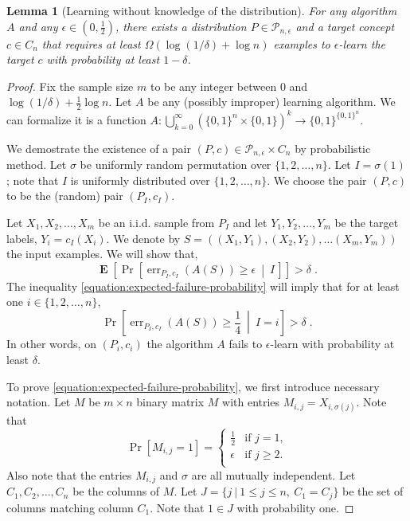 \documentclass[12pt]{article}
\newtheorem{lemma}[proposition]{Lemma}
\renewcommand{\P}{\mathcal{P}}
\DeclareMathOperator{\err}{err}
\DeclareMathOperator{\Exp}{\mathbf{E}}
\begin{document}
\begin{lemma}[Learning without knowledge of the distribution]
For any algorithm $A$ and any $\epsilon \in (0,\frac{1}{2})$,
there exists a distribution $P \in \P_{n,\epsilon}$
and a target concept $c \in C_n$ that requires at least $\Omega(\log(1/\delta) + \log n)$
examples to $\epsilon$-learn the target $c$ with probability at least $1 - \delta$.
\end{lemma}

\begin{proof}
Fix the sample size $m$ to be any integer between $0$ and $\log(1/\delta) + \frac{1}{2} \log n$.
Let $A$ be any (possibly improper) learning algorithm. We can formalize
it is a function $A:\bigcup_{k=0}^\infty (\{0,1\}^n \times \{0,1\})^k \to
\{0,1\}^{\{0,1\}^n}$.

We demostrate the existence of a pair $(P,c) \in \P_{n,\epsilon} \times C_n$ by
probabilistic method. Let $\sigma$ be uniformly random permutation over
$\{1,2,\dots,n\}$. Let $I = \sigma(1)$; note that $I$ is uniformly distributed
over $\{1,2,\dots,n\}$. We choose the pair $(P,c)$ to be the (random) pair
$(P_I,c_I)$.

Let $X_1, X_2, \dots, X_m$ be an i.i.d. sample from $P_I$ and
let $Y_1, Y_2, \dots, Y_m$ be the target labels, $Y_i = c_I(X_i)$.
We denote by $S = ((X_1, Y_1), (X_2, Y_2), \dots (X_m, Y_m))$ the input examples.
We will show that,
\begin{equation}
\label{equation:expected-failure-probability}
\Exp \left[ \Pr \left[\err_{P_I,c_I}(A(S)) \ge \epsilon \ \middle| \ I \, \right] \right] > \delta \; .
\end{equation}
The inequality \eqref{equation:expected-failure-probability} will imply that for at least one $i \in \{1,2,\dots,n\}$,
$$
\Pr \left[\err_{P_I,c_I}(A(S)) \ge \frac{1}{4} \ \middle| \ I = i \right] > \delta \; .
$$
In other words, on $(P_i, c_i)$ the algorithm $A$ fails to
$\epsilon$-learn with probability at least $\delta$.

To prove \eqref{equation:expected-failure-probability}, we first introduce
necessary notation. Let $M$ be $m \times n$ binary matrix $M$ with entries
$M_{i,j} = X_{i,\sigma(j)}$. Note that
$$
\Pr[M_{i,j} = 1] =
\begin{cases}
\frac{1}{2} & \text{if $j = 1$,} \\
\epsilon & \text{if $j \ge 2$.} \\
\end{cases}
$$
Also note that the entries $M_{i,j}$ and $\sigma$ are all mutually independent. Let $C_1, C_2,
\dots, C_n$ be the columns of $M$. Let $J = \{ j ~|~ 1 \le j \le n, \ C_1 = C_j \}$
be the set of columns matching column $C_1$. Note that $1 \in J$ with probability one.


\end{proof}
\end{document}
